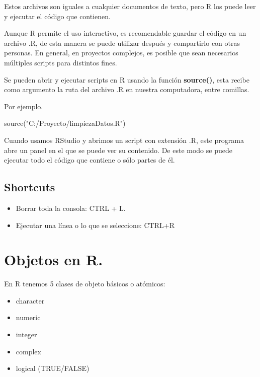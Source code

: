 \documentclass[
  12pt,
]{book}
\newenvironment{Shaded}{\begin{snugshade}}{\end{snugshade}}
\newcommand{\FunctionTok}[1]{\textcolor[rgb]{0.00,0.00,0.00}{#1}}
\newcommand{\NormalTok}[1]{#1}
\newcommand{\StringTok}[1]{\textcolor[rgb]{0.31,0.60,0.02}{#1}}
\providecommand{\tightlist}{%
  \setlength{\itemsep}{0pt}\setlength{\parskip}{0pt}}
\begin{document}
Estos archivos son iguales a cualquier documentos de texto, pero R los puede leer y ejecutar el código que contienen.

Aunque R permite el uso interactivo, es recomendable guardar el código en un archivo .R, de esta manera se puede utilizar después y compartirlo con otras personas. En general, en proyectos complejos, es posible que sean necesarios múltiples scripts para distintos fines.

Se pueden abrir y ejecutar scripts en R usando la función \textbf{source()}, esta recibe como argumento la ruta del archivo .R en nuestra computadora, entre comillas.

Por ejemplo.

\begin{Shaded}
\begin{Highlighting}[]
\FunctionTok{source}\NormalTok{(}\StringTok{"C:/Proyecto/limpiezaDatos.R"}\NormalTok{)}
\end{Highlighting}
\end{Shaded}

Cuando usamos RStudio y abrimos un script con extensión .R, este programa abre un panel en el que se puede ver su contenido. De este modo se puede ejecutar todo el código que contiene o sólo partes de él.

\hypertarget{shortcuts}{%
\section{\texorpdfstring{\textbf{Shortcuts}}{Shortcuts}}\label{shortcuts}}

\begin{itemize}
\tightlist
\item
  Borrar toda la consola: CTRL + L.
\item
  Ejecutar una línea o lo que se seleccione: CTRL+R
\end{itemize}

\hypertarget{objetos-en-r.}{%
\chapter{\texorpdfstring{\textbf{Objetos en R.}}{Objetos en R.}}\label{objetos-en-r.}}

En R tenemos 5 clases de objeto básicos o atómicos:

\begin{itemize}
\tightlist
\item
  character
\item
  numeric
\item
  integer
\item
  complex
\item
  logical (TRUE/FALSE)
\end{itemize}
\end{document}
